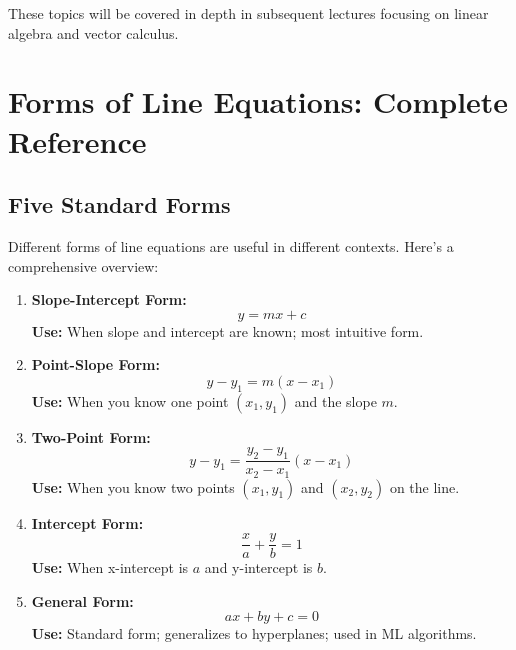 \documentclass[12pt,a4paper]{article}
\theoremstyle{directpoint}
\theoremstyle{definition}
\begin{document}
These topics will be covered in depth in subsequent lectures focusing on linear algebra and vector calculus.

\newpage

\section{Forms of Line Equations: Complete Reference}

\subsection{Five Standard Forms}

Different forms of line equations are useful in different contexts. Here's a comprehensive overview:

\begin{enumerate}
    \item \textbf{Slope-Intercept Form:}
    \begin{equation}
    y = mx + c
    \end{equation}
    \textbf{Use:} When slope and intercept are known; most intuitive form.
    
    \item \textbf{Point-Slope Form:}
    \begin{equation}
    y - y_1 = m(x - x_1)
    \end{equation}
    \textbf{Use:} When you know one point $(x_1, y_1)$ and the slope $m$.
    
    \item \textbf{Two-Point Form:}
    \begin{equation}
    y - y_1 = \frac{y_2 - y_1}{x_2 - x_1}(x - x_1)
    \end{equation}
    \textbf{Use:} When you know two points $(x_1, y_1)$ and $(x_2, y_2)$ on the line.
    
    \item \textbf{Intercept Form:}
    \begin{equation}
    \frac{x}{a} + \frac{y}{b} = 1
    \end{equation}
    \textbf{Use:} When x-intercept is $a$ and y-intercept is $b$.
    
    \item \textbf{General Form:}
    \begin{equation}
    ax + by + c = 0
    \end{equation}
    \textbf{Use:} Standard form; generalizes to hyperplanes; used in ML algorithms.
\end{enumerate}
\end{document}
